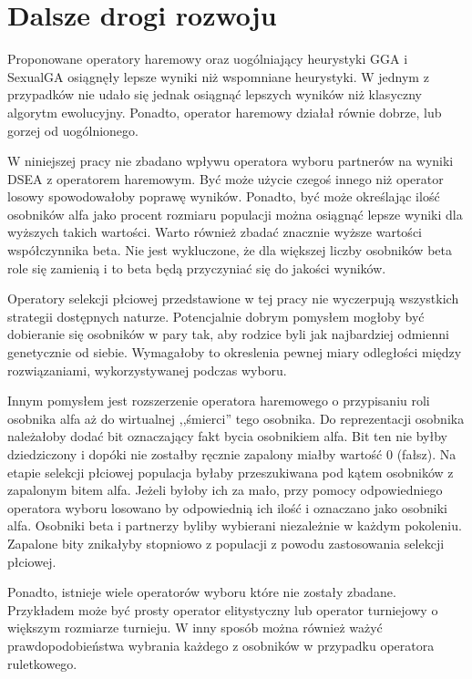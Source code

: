 \documentclass[./FM_mgr.tex]{subfiles}
\begin{document}
\chapter{Dalsze drogi rozwoju}

Proponowane operatory haremowy oraz uogólniający heurystyki GGA i SexualGA osiągnęły lepsze wyniki niż wspomniane heurystyki.
W jednym z przypadków nie udało się jednak osiągnąć lepszych wyników niż klasyczny algorytm ewolucyjny.
Ponadto, operator haremowy działał równie dobrze, lub gorzej od uogólnionego.

W niniejszej pracy nie zbadano wpływu operatora wyboru partnerów na wyniki DSEA z operatorem haremowym.
Być może użycie czegoś innego niż operator losowy spowodowałoby poprawę wyników.
Ponadto, być może określając ilość osobników alfa jako procent rozmiaru populacji można osiągnąć lepsze wyniki dla wyższych takich wartości.
Warto również zbadać znacznie wyższe wartości współczynnika beta.
Nie jest wykluczone, że dla większej liczby osobników beta role się zamienią i to beta będą przyczyniać się do jakości wyników.

Operatory selekcji płciowej przedstawione w tej pracy nie wyczerpują wszystkich strategii dostępnych naturze.
Potencjalnie dobrym pomysłem mogłoby być dobieranie się osobników w pary tak, aby rodzice byli jak najbardziej odmienni genetycznie od siebie.
Wymagałoby to okreslenia pewnej miary odległości między rozwiązaniami, wykorzystywanej podczas wyboru.

Innym pomysłem jest rozszerzenie operatora haremowego o przypisaniu roli osobnika alfa aż do wirtualnej ,,śmierci'' tego osobnika.
Do reprezentacji osobnika należałoby dodać bit oznaczający fakt bycia osobnikiem alfa.
Bit ten nie byłby dziedziczony i dopóki nie zostałby ręcznie zapalony miałby wartość 0 (fałsz).
Na etapie selekcji płciowej populacja byłaby przeszukiwana pod kątem osobników z zapalonym bitem alfa.
Jeżeli byłoby ich za mało, przy pomocy odpowiedniego operatora wyboru losowano by odpowiednią ich ilość i oznaczano jako osobniki alfa.
Osobniki beta i partnerzy byliby wybierani niezależnie w każdym pokoleniu.
Zapalone bity znikałyby stopniowo z populacji z powodu zastosowania selekcji płciowej.

Ponadto, istnieje wiele operatorów wyboru które nie zostały zbadane.
Przykładem może być prosty operator elitystyczny lub operator turniejowy o większym rozmiarze turnieju.
W inny sposób można również ważyć prawdopodobieństwa wybrania każdego z osobników w przypadku operatora ruletkowego.
\end{document}
